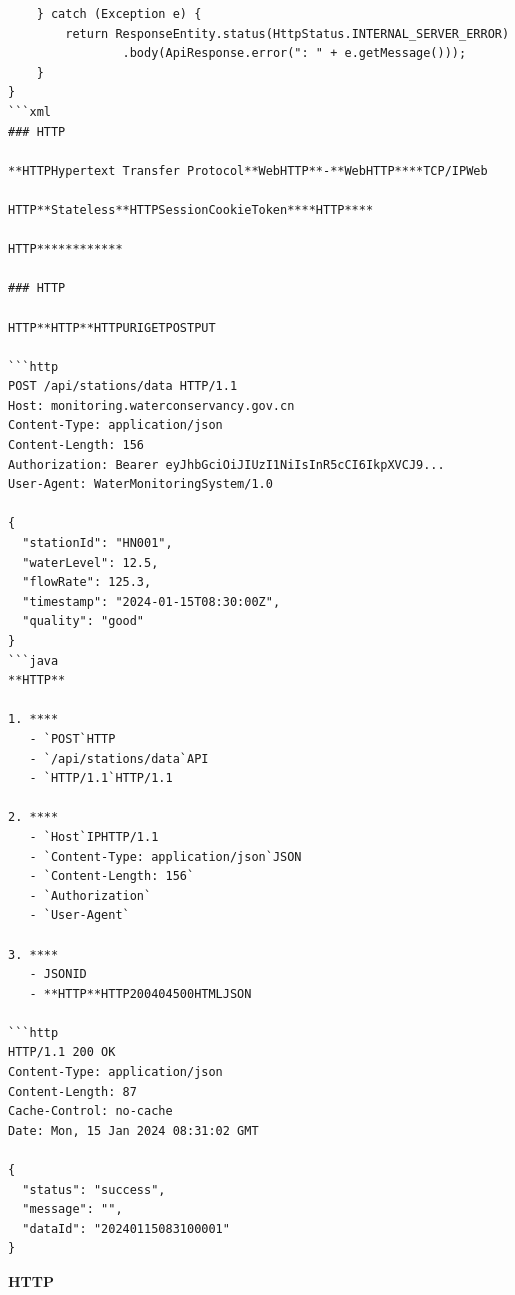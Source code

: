 \begin{verbatim}
    } catch (Exception e) {
        return ResponseEntity.status(HttpStatus.INTERNAL_SERVER_ERROR)
                .body(ApiResponse.error(": " + e.getMessage()));
    }
}
```xml
### HTTP

**HTTPHypertext Transfer Protocol**WebHTTP**-**WebHTTP****TCP/IPWeb

HTTP**Stateless**HTTPSessionCookieToken****HTTP****

HTTP************

### HTTP

HTTP**HTTP**HTTPURIGETPOSTPUT

```http
POST /api/stations/data HTTP/1.1
Host: monitoring.waterconservancy.gov.cn
Content-Type: application/json
Content-Length: 156
Authorization: Bearer eyJhbGciOiJIUzI1NiIsInR5cCI6IkpXVCJ9...
User-Agent: WaterMonitoringSystem/1.0

{
  "stationId": "HN001",
  "waterLevel": 12.5,
  "flowRate": 125.3,
  "timestamp": "2024-01-15T08:30:00Z",
  "quality": "good"
}
```java
**HTTP**

1. ****
   - `POST`HTTP
   - `/api/stations/data`API
   - `HTTP/1.1`HTTP/1.1

2. ****
   - `Host`IPHTTP/1.1
   - `Content-Type: application/json`JSON
   - `Content-Length: 156`
   - `Authorization`
   - `User-Agent`

3. ****
   - JSONID
   - **HTTP**HTTP200404500HTMLJSON

```http
HTTP/1.1 200 OK
Content-Type: application/json
Content-Length: 87
Cache-Control: no-cache
Date: Mon, 15 Jan 2024 08:31:02 GMT

{
  "status": "success",
  "message": "",
  "dataId": "20240115083100001"
}
\end{verbatim}

\textbf{HTTP}

